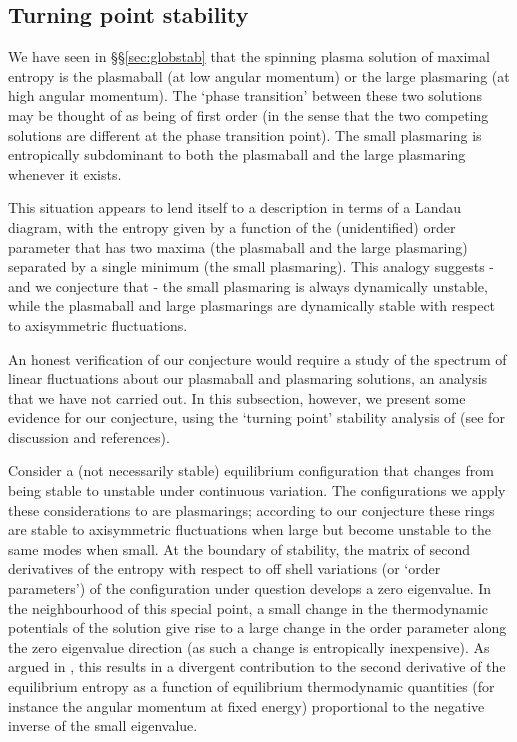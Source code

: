 \documentclass[12pt,a4paper]{article}
\begin{document}
\subsection{Turning point stability}\label{sec:turn}

We have seen in \S\S\ref{sec:globstab} that the spinning plasma
solution of maximal entropy is the plasmaball (at low angular
momentum) or the large plasmaring (at high angular momentum). The
`phase transition' between these two solutions may be thought of as
being of first order (in the sense that the two competing solutions
are different at the phase transition point). The small plasmaring
is entropically subdominant to both the plasmaball and the large
plasmaring whenever it exists.

This situation appears to lend itself to a description in terms of a
Landau diagram, with the entropy given by a function of the
(unidentified) order parameter that has two maxima (the plasmaball
and the large plasmaring) separated by a single minimum (the small
plasmaring). This analogy suggests - and we conjecture that - the
small plasmaring is always dynamically unstable, while the
plasmaball and large plasmarings are dynamically stable with respect
to axisymmetric fluctuations.

An honest verification of our conjecture would require a study of
the spectrum of linear fluctuations about our plasmaball and
plasmaring solutions, an analysis that we have not carried out. In
this subsection, however, we present some evidence for our
conjecture, using the `turning point' stability analysis of
\cite{Poincare-lequdunemassflui:85} (see \cite{Arcioni:2004ww} for
discussion and references).

Consider a (not necessarily stable) equilibrium configuration that
changes from being stable to unstable under continuous variation.
The configurations we apply these considerations to are plasmarings;
according to our conjecture these rings are stable to axisymmetric
fluctuations when large but become unstable to the same modes when
small. At the boundary of stability, the matrix of second
derivatives of the entropy with respect to off shell variations (or
`order parameters') of the configuration under question develops a
zero eigenvalue. In the neighbourhood of this special point, a small
change in the thermodynamic potentials of the solution give rise to
a large change in the order parameter along the zero eigenvalue
direction (as such a change is entropically inexpensive). As argued
in \cite{1978MNRAS.183..765K, 1979MNRAS.189..817K, Sorkin:1981jc,
Sorkin:1982ut}, this results in a divergent contribution to the
second derivative of the equilibrium entropy as a function of
equilibrium thermodynamic quantities (for instance the angular
momentum at fixed energy) proportional to the negative inverse of
the small eigenvalue.
\end{document}
